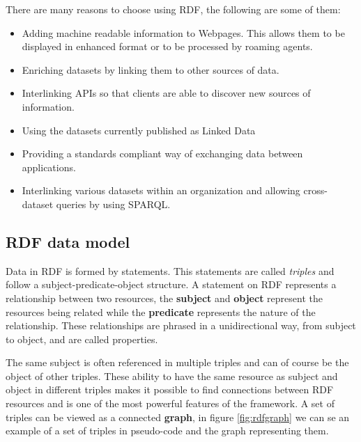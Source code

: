 There are many reasons to choose using RDF, the following are some of them:

\begin{itemize}
	\item Adding machine readable information to Webpages. This allows them to be displayed in enhanced format or to be processed by roaming agents.
	\item Enriching datasets by linking them to other sources of data.
	\item Interlinking APIs so that clients are able to discover new sources of information.
	\item Using the datasets currently published as Linked Data 
	\item Providing a standards compliant way of exchanging data between applications.
	\item Interlinking various datasets within an organization and allowing cross-dataset queries by using SPARQL.
\end{itemize}

\subsection*{RDF data model}

Data in RDF is formed by statements. This statements are called \textit{triples} and follow a subject-predicate-object structure. A statement on RDF represents a relationship between two resources, the \textbf{subject} and \textbf{object} represent the resources being related while the \textbf{predicate} represents the nature of the relationship. These relationships are phrased in a unidirectional way, from subject to object, and are called properties.

The same subject is often referenced in multiple triples and can of course be the object of other triples. These ability to have the same resource as subject and object in different triples makes it possible to find connections between RDF resources and is one of the most powerful features of the framework. A set of triples can be viewed as a connected \textbf{graph}, in figure \ref{fig:rdfgraph} we can se an example of a set of triples in pseudo-code and the graph representing them.

